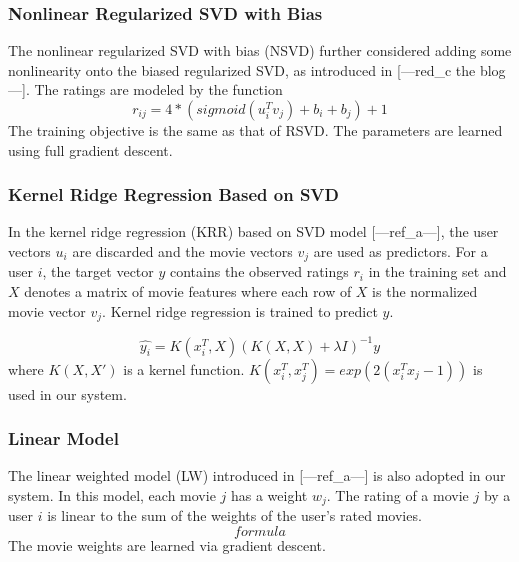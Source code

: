 \documentclass[10pt,conference,compsocconf]{IEEEtran}
\begin{document}
\subsubsection{Nonlinear Regularized SVD with Bias}
The nonlinear regularized SVD with bias (NSVD) further considered adding some nonlinearity onto the biased regularized SVD, as introduced in [---red\_c the blog---]. The ratings are modeled by the function $$r_{ij}= 4*(sigmoid(u_{i}^{T}v_{j}) + b_i + b_j)+1$$
The training objective is the same as that of RSVD. The parameters are learned using full gradient descent.

\subsubsection{Kernel Ridge Regression Based on SVD}
In the kernel ridge regression (KRR) based on SVD model [---ref\_a---], the user vectors $u_i$ are discarded and the movie vectors $v_j$ are used as predictors. For a user $i$, the target vector $y$ contains the observed ratings $r_i$ in the training set and $X$ denotes a matrix of movie features where each row of $X$ is the normalized movie vector $v_j$. Kernel ridge regression is trained to predict $y$.

$$ \hat{y_i} = K(x_i^T, X)(K(X,X) + \lambda I)^{-1}y$$
where $K(X, X')$ is a kernel function. $K(x_{i}^{T}, x_{j}^{T})=exp(2(x_i^Tx_j-1))$ is used in our system.

\subsubsection{Linear Model}
The linear weighted model (LW) introduced in [---ref\_a---] is also adopted in our system. In this model, each movie $j$ has a weight $w_j$. The rating of a movie $j$ by a user $i$ is linear to the sum of the weights of the user's rated movies. $$formula$$ The movie weights are learned via gradient descent.

%
\end{document}
